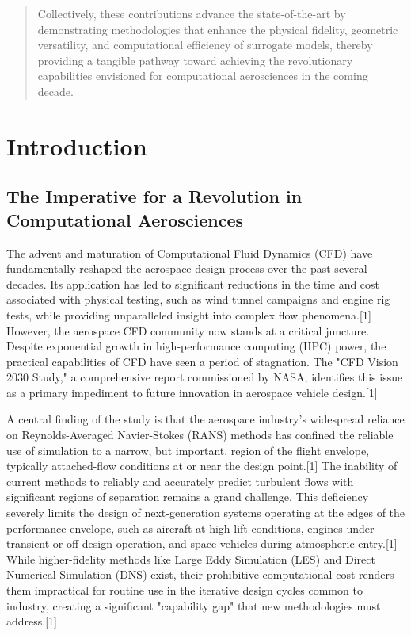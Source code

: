 \documentclass[12pt, a4paper]{report}
\begin{document}
\begin{abstract}
Collectively, these contributions advance the state-of-the-art by demonstrating methodologies that enhance the physical fidelity, geometric versatility, and computational efficiency of surrogate models, thereby providing a tangible pathway toward achieving the revolutionary capabilities envisioned for computational aerosciences in the coming decade.
\end{abstract}

\tableofcontents

\chapter{Introduction}

\section{The Imperative for a Revolution in Computational Aerosciences}

The advent and maturation of Computational Fluid Dynamics (CFD) have fundamentally reshaped the aerospace design process over the past several decades. Its application has led to significant reductions in the time and cost associated with physical testing, such as wind tunnel campaigns and engine rig tests, while providing unparalleled insight into complex flow phenomena.[1] However, the aerospace CFD community now stands at a critical juncture. Despite exponential growth in high-performance computing (HPC) power, the practical capabilities of CFD have seen a period of stagnation. The "CFD Vision 2030 Study," a comprehensive report commissioned by NASA, identifies this issue as a primary impediment to future innovation in aerospace vehicle design.[1]

A central finding of the study is that the aerospace industry's widespread reliance on Reynolds-Averaged Navier-Stokes (RANS) methods has confined the reliable use of simulation to a narrow, but important, region of the flight envelope, typically attached-flow conditions at or near the design point.[1] The inability of current methods to reliably and accurately predict turbulent flows with significant regions of separation remains a grand challenge. This deficiency severely limits the design of next-generation systems operating at the edges of the performance envelope, such as aircraft at high-lift conditions, engines under transient or off-design operation, and space vehicles during atmospheric entry.[1] While higher-fidelity methods like Large Eddy Simulation (LES) and Direct Numerical Simulation (DNS) exist, their prohibitive computational cost renders them impractical for routine use in the iterative design cycles common to industry, creating a significant "capability gap" that new methodologies must address.[1]
\end{document}
